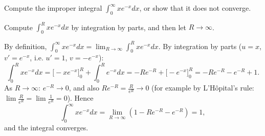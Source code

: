 
\begin{question}
Compute the improper integral $\int_0^\infty xe^{-x}dx$, or show that it does not converge.
\end{question}

\begin{hint}
Compute $\int_0^R xe^{-x}dx$ by integration by parts, and then let $R\to\infty$.
\end{hint}

\begin{solution}
By definition, $\int_0^\infty xe^{-x}dx=\lim_{R\to\infty}\int_0^R xe^{-x}dx$.
By integration by parts ($u=x$, $v'=e^{-x}$, i.e. $u'=1$, $v=-e^{-x}$):
\[ \int_0^R xe^{-x}dx=\Big[-xe^{-x}\Big]_0^R+\int_0^R e^{-x}dx=-Re^{-R}+\Big[-e^{-x}\Big]_0^R=-Re^{-R}-e^{-R}+1. \]
As $R\to\infty$: $e^{-R}\to0$, and also $Re^{-R}=\frac{R}{e^R}\to0$ (for example by L'Hôpital's rule: $\lim\frac{R}{e^R}=\lim\frac1{e^R}=0$). Hence
\[ \int_0^\infty xe^{-x}dx=\lim_{R\to\infty}\left(1-Re^{-R}-e^{-R}\right)=\boxed{1}, \]
and the integral converges.
\end{solution}
